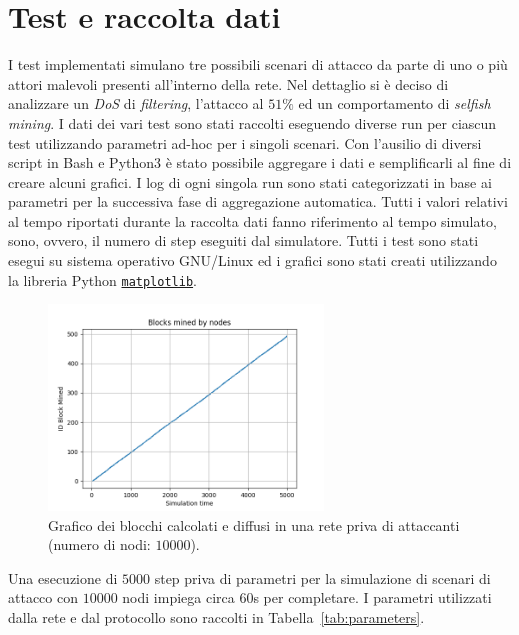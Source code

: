\chapter{Test e raccolta dati}

I test implementati simulano tre possibili scenari di attacco da parte di uno o più attori malevoli presenti all'interno della rete.\newline
Nel dettaglio si è deciso di analizzare un \textit{DoS} di \textit{filtering}, l'attacco al $51\%$ ed un comportamento di \textit{selfish mining}.\newline
I dati dei vari test sono stati raccolti eseguendo diverse run per ciascun test utilizzando parametri ad-hoc per i singoli scenari. Con l'ausilio di diversi script in Bash e Python3 è stato possibile aggregare i dati e semplificarli al fine di creare alcuni grafici. I log di ogni singola run sono stati categorizzati in base ai parametri per la successiva fase di aggregazione automatica. Tutti i valori relativi al tempo riportati durante la raccolta dati fanno riferimento al tempo simulato, sono, ovvero, il numero di step eseguiti dal simulatore.
Tutti i test sono stati esegui su sistema operativo GNU/Linux ed i grafici sono stati creati utilizzando la libreria Python \href{https://matplotlib.org/}{\texttt{matplotlib}}.
\begin{figure}[H]
    \centering
    \includegraphics[width=0.65\textwidth]{./images/all-test-51-1.png}
    \caption{Grafico dei blocchi calcolati e diffusi in una rete priva di attaccanti (numero di nodi: $10000$).}
\end{figure}
Una esecuzione di $5000$ step priva di parametri per la simulazione di scenari di attacco con $10000$ nodi impiega circa $60$s per completare.\newline
I parametri utilizzati dalla rete e dal protocollo sono raccolti in Tabella~\ref{tab:parameters}.
